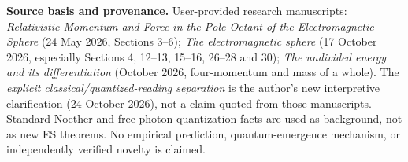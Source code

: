 \documentclass[10.5pt,a4paper]{article}
\begin{document}
\vspace{6pt}
\textbf{Source basis and provenance.} User-provided research manuscripts: \emph{Relativistic Momentum and Force in the Pole Octant of the Electromagnetic Sphere} (24 May 2026, Sections 3--6); \emph{The electromagnetic sphere} (17 October 2026, especially Sections 4, 12--13, 15--16, 26--28 and 30); \emph{The undivided energy and its differentiation} (October 2026, four-momentum and mass of a whole). The \emph{explicit classical/quantized-reading separation} is the author's new interpretive clarification (24 October 2026), not a claim quoted from those manuscripts. Standard Noether and free-photon quantization facts are used as background, not as new ES theorems. No empirical prediction, quantum-emergence mechanism, or independently verified novelty is claimed.
\end{document}
